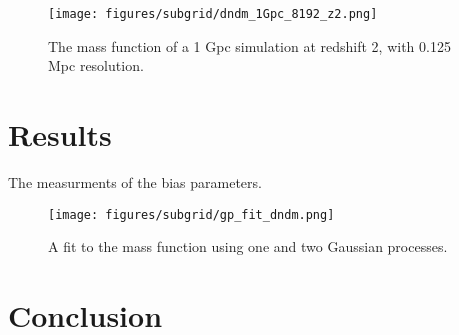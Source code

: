 \begin{figure}[h!] %
\begin{center}
\texttt{[image: figures/subgrid/dndm\_1Gpc\_8192\_z2.png]}%
\caption{The mass function of a 1 Gpc simulation at redshift 2, with 0.125 Mpc resolution.}
\label{musicdndm}
\end{center}
\end{figure}

\section{Results}
\label{ch:signal:sec:results}

The measurments of the bias parameters.

\begin{figure}[h!] %
\begin{center}
\texttt{[image: figures/subgrid/gp\_fit\_dndm.png]}%
\caption{A fit to the mass function using one and two Gaussian processes.}
\label{gpfit}
\end{center}
\end{figure}

\section{Conclusion}
\label{ch:signal:sec:conclusion}
